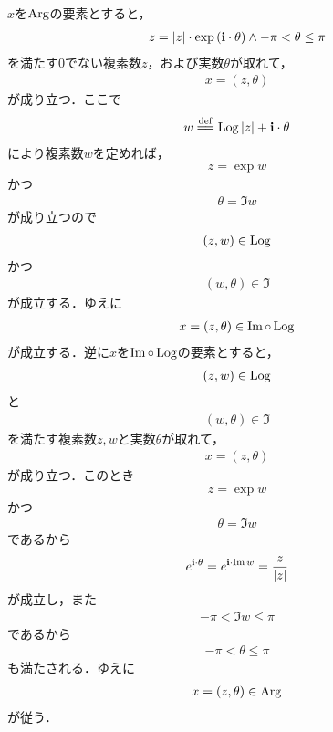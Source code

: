 	\begin{sketch}
		$x$を$\operatorname{Arg}$の要素とすると，
		\begin{align}
			z = |z| \cdot \exp{(\mathbf{i}\cdot \theta)} \wedge -\pi < \theta \leq \pi
		\end{align}
		を満たす$0$でない複素数$z$，および実数$\theta$が取れて，
		\begin{align}
			x = (z,\theta)
		\end{align}
		が成り立つ．ここで
		\begin{align}
			w \defeq \pvlog{|z|} + \isym \cdot \theta
		\end{align}
		により複素数$w$を定めれば，
		\begin{align}
			z = \exp{w}
		\end{align}
		かつ
		\begin{align}
			\theta = \Im{w}
		\end{align}
		が成り立つので
		\begin{align}
			(z,w) \in \operatorname{Log}
		\end{align}
		かつ
		\begin{align}
			(w,\theta) \in \Im
		\end{align}
		が成立する．ゆえに
		\begin{align}
			x = (z,\theta) \in \operatorname{Im} \circ \operatorname{Log}
		\end{align}
		が成立する．逆に$x$を$\operatorname{Im} \circ \operatorname{Log}$の要素とすると，
		\begin{align}
			(z,w) \in \operatorname{Log}
		\end{align}
		と
		\begin{align}
			(w,\theta) \in \Im
		\end{align}
		を満たす複素数$z,w$と実数$\theta$が取れて，
		\begin{align}
			x = (z,\theta)
		\end{align}
		が成り立つ．このとき
		\begin{align}
			z = \exp{w}
		\end{align}
		かつ
		\begin{align}
			\theta = \Im{w}
		\end{align}
		であるから
		\begin{align}
			e^{\mathbf{i} \cdot \theta} = e^{\mathbf{i} \cdot \operatorname{Im} w} = \frac{z}{|z|}
		\end{align}
		が成立し，また
		\begin{align}
			-\pi < \Im{w} \leq \pi
		\end{align}
		であるから
		\begin{align}
			-\pi < \theta \leq \pi
		\end{align}
		も満たされる．ゆえに
		\begin{align}
			x = (z,\theta) \in \operatorname{Arg}
		\end{align}
		が従う．
		\QED
	\end{sketch}
	
